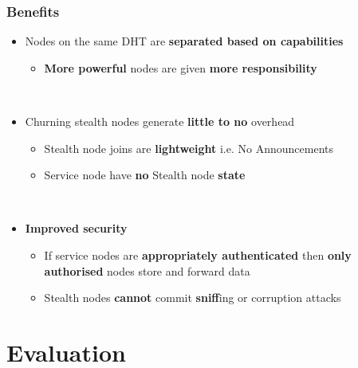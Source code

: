 \documentclass[xcolor=pdftex,dvipsnames,table]{beamer}
\begin{document}
\begin{frame}
    \frametitle{Benefits}
    \begin{itemize}
    \item{Nodes on the same DHT are \textbf{separated based on capabilities}}
        \begin{itemize}
        \item{\textbf{More powerful} nodes are given \textbf{more responsibility}}
        \end{itemize}
    ~\\
    \item{Churning stealth nodes generate \textbf{little to no} overhead}
        \begin{itemize}
        \item{Stealth node joins are \textbf{lightweight} i.e. No Announcements}
        \item{Service node have \textbf{no} Stealth node \textbf{state}}
        \end{itemize}
    ~\\
    \item{\textbf{Improved security}}
        \begin{itemize}
        \item{If service nodes are \textbf{appropriately authenticated} then \textbf{only authorised} nodes store and forward data}
        \item{Stealth nodes \textbf{cannot} commit \textbf{sniff}ing or corruption attacks}
        \end{itemize}
    \end{itemize}
\end{frame}

\section{Evaluation}
\end{document}
